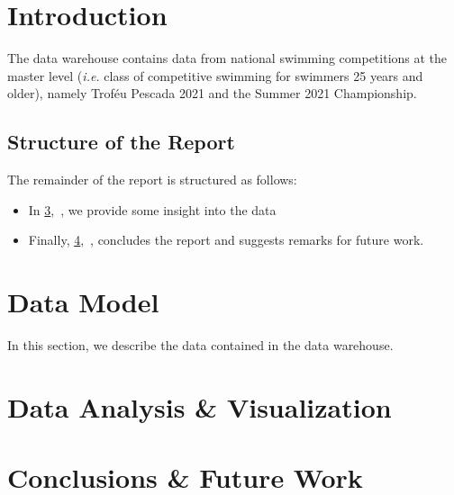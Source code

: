 \documentclass[a4paper, 11pt]{article}
\begin{document}
\pagebreak

\tableofcontents
\listoffigures \pagebreak


\section{Introduction}

The data warehouse contains data from national swimming competitions at the master level (\textit{i.e.} class of
competitive swimming for swimmers 25 years and older), namely Troféu Pescada 2021 and the Summer 2021 Championship.

\subsection*{Structure of the Report}

The remainder of the report is structured as follows:

\begin{itemize}
    \item In \cref{sec:analysis},~\textbf{}, we provide some insight into the data
    \item Finally, \cref{sec:conclusion},~\textbf{}, concludes the report and suggests remarks
    for future work.
\end{itemize}

\pagebreak

\section{Data Model} \label{sec:data-model}

In this section, we describe the data contained in the data warehouse.

\pagebreak

\section{Data Analysis \& Visualization} \label{sec:analysis}

\pagebreak

\section{Conclusions \& Future Work} \label{sec:conclusion}
\end{document}
